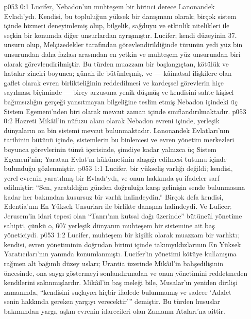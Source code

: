 \vs p053 0:1 Lucifer, Nebadon’un muhteşem bir birinci derece Lanonandek Evladı’ydı. Kendisi, bu topluluğun yüksek bir danışmanı olarak; birçok sistem içinde hizmeti deneyimlemiş olup, bilgelik, sağduyu ve etkinlik nitelikleri ile seçkin bir konumda diğer unsurlardan ayrışmıştır. Lucifer; kendi düzeyinin 37. unsuru olup, Melçizedekler tarafından görevlendirildiğinde türünün yedi yüz bin unsurundan daha fazlası arasından en yetkin ve muhteşem yüz unsurundan biri olarak görevlendirilmiştir. Bu türden muazzam bir başlangıçtan, kötülük ve hatalar zinciri boyunca; günah ile bütünleşmiş, ve --- kâinatsal ilişkilere olan gaflet olarak evren birlikteliğinin reddedilmesi ve kardeşsel görevlerin hiçe sayılması biçiminde --- birey arzusuna yenik düşmüş ve kendisini sahte kişisel bağımsızlığın gerçeği yansıtmayan bilgeliğine teslim etmiş Nebadon içindeki üç Sistem Egemeni’nden biri olarak mevcut zaman içinde sınıflandırılmaktadır.
\vs p053 0:2 Hazreti Mikâil’in nüfuzu alanı olarak Nebadon evreni içinde, yerleşik dünyaların on bin sistemi mevcut bulunmaktadır. Lanonandek Evlatları’nın tarihinin bütünü içinde, sistemlerin bu binlercesi ve evren yönetim merkezleri boyunca görevlerinin tümü içerisinde, şimdiye kadar yalnızca üç Sistem Egemeni’nin; Yaratan Evlat’ın hükümetinin alaşağı edilmesi tutumu içinde bulunduğu gözlenmiştir.
\vs p053 1:1 Lucifer, bir yükseliş varlığı değildi; kendisi, yerel evrenin yaratılmış bir Evladı’ydı, ve onun hakkında şu ifadeler sarf edilmiştir: “Sen, yaratıldığın günden doğruluğa karşı gelinişin sende bulunmasına kadar her bakımdan kusursuz bir varlık halindeydin.” Birçok defa kendisi, Edentia’nın En Yüksek Unsurları ile birlikte danışma halindeydi. Ve Luficer; Jerusem’in idari tepesi olan “Tanrı’nın kutsal dağı üzerinde” bütüncül yönetime sahipti, çünkü o, 607 yerleşik dünyanın muhteşem bir sistemine ait baş yöneticiydi.
\vs p053 1:2 Lucifer, muhteşem bir kişilik olarak muazzam bir varlıktı; kendisi, evren yönetiminin doğrudan birimi içinde takımyıldızlarının En Yüksek Yaratıcıları’nın yanında konumlanmıştı. Lucifer’in yönetimi kötüye kullanışına rağmen alt bağımlı düzey usları; Urantia üzerinde Mikâil’in bahşedilişinin öncesinde, ona saygı göstermeyi sonlandırmadan ve onun yönetimini reddetmeden kendilerini sakınmışlardır. Mikâil’in baş meleği bile, Musalar’ın yeniden dirilişi zamanında, “kendisini suçlayıcı hiçbir ifadede bulunmamış ve sadece ‘Adalet senin hakkında gereken yargıyı verecektir’” demiştir. Bu türden hususlar bakımından yargı, aşkın evrenin idarecileri olan Zamanın Ataları’na aittir.
